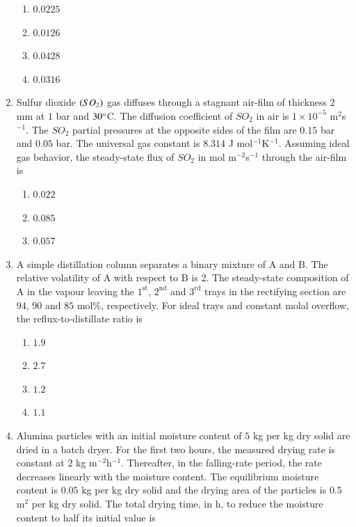 \documentclass[journal,12pt,onecolumn]{IEEEtran}
\theoremstyle{remark}
\begin{document}
\begin{enumerate}
	\hfill{}
	\begin{enumerate}
		\item $0.0225$
		\item $0.0126$
		\item $0.0428$
		\item $0.0316$
	\end{enumerate}
	
	\item Sulfur dioxide $\left(SO_2\right)$ gas diffuses through a stagnant air-film of thickness $2$ mm at $1$ bar and $30\degree$C. The diffusion coefficient of $SO_2$ in air is $1 \times 10^{-5}$ m$^2$s$^{-1}$. The $SO_2$ partial pressures at the opposite sides of the film are $0.15$ bar and $0.05$ bar. The universal gas constant is $8.314$ J mol$^{-1}$K$^{-1}$. Assuming ideal gas behavior, the steady-state flux of $SO_2$ in mol m$^{-2}$s$^{-1}$ through the air-film is
	
	\hfill{}
	\begin{enumerate}
		\item $0.022$
		\item $0.085$
		\item $0.057$
	\end{enumerate}
	
	\item A simple distillation column separates a binary mixture of A and B. The relative volatility of A with respect to B is 2. The steady-state composition of A in the vapour leaving the $1^{\text{st}}$, $2^{\text{nd}}$ and $3^{\text{rd}}$ trays in the rectifying section are $94$, $90$ and $85$ mol\%, respectively. For ideal trays and constant molal overflow, the reflux-to-distillate ratio is
	
	\hfill{}
	\begin{enumerate}
		\item $1.9$
		\item $2.7$
		\item $1.2$
		\item $1.1$
	\end{enumerate}
	
	\item Alumina particles with an initial moisture content of $5$ kg per kg dry solid are dried in a batch dryer. For the first two hours, the measured drying rate is constant at $2$ kg m$^{-2}$h$^{-1}$. Thereafter, in the falling-rate period, the rate decreases linearly with the moisture content. The equilibrium moisture content is $0.05$ kg per kg dry solid and the drying area of the particles is $0.5$ m$^2$ per kg dry solid. The total drying time, in h, to reduce the moisture content to half its initial value is
	

\end{enumerate}
\end{document}
